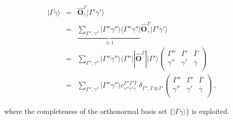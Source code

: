 \documentclass[twocolumn,prb,twocolumn,amsmath,superscriptaddress,nofootinbib,amssymb]{revtex4-1}
\newcommand{\vect}[1]{\boldsymbol{#1}}
\begin{document}
\begin{widetext}
\begin{eqnarray}
|\Gamma\gamma\rangle&=&\hat{\vect{O}}_{\overline{\gamma}}^{\overline{\Gamma}}|\Gamma'\gamma'\rangle\nonumber\\
&=&\underbrace{\sum_{\Gamma'',\gamma''}|\Gamma''\gamma''\rangle\langle \Gamma'' \gamma''|}_{\equiv1}\hat{\vect{O}}_{\overline{\gamma}}^{\overline{\Gamma}}|\Gamma'\gamma'\rangle\nonumber\\
&=&\sum_{\Gamma'',\gamma''}|\Gamma''\gamma''\rangle \langle \Gamma''  || \hat{\vect{O}}^{\overline{\Gamma}} ||\Gamma'\rangle \left(
                                                                             \begin{array}{ccc}
                                                                               \Gamma'' & \Gamma' & \overline{\Gamma} \nonumber\\
                                                                                \gamma''& \gamma' & \overline{\gamma} \\
                                                                             \end{array}
                                                                           \right)\nonumber\\
&=&\sum_{\Gamma'',\gamma''}|\Gamma''\gamma''\rangle c^{\Gamma''\Gamma'\overline{\Gamma}}_{\gamma''\gamma'\overline{\gamma}}~\delta_{\Gamma'',\overline{\Gamma}\otimes \Gamma'} \left(
                                                                             \begin{array}{ccc}
                                                                               \Gamma'' & \Gamma' & \overline{\Gamma} \\
                                                                                \gamma''& \gamma' & \overline{\gamma} \\
                                                                             \end{array}
                                                                           \right)~,
\end{eqnarray}

\noindent where the completeness of the orthonormal basis set $\{|\Gamma\gamma\rangle\}$ is exploited.





\end{widetext}
\end{document}
